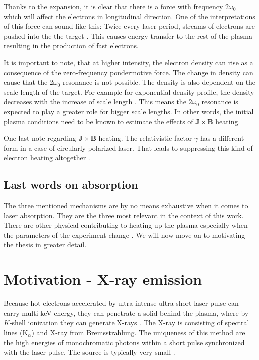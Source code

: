 Thanks to the expansion, it is clear that there is a force with frequency $2\omega_0$ which will affect the electrons in longitudinal direction. One of the interpretations of this force can sound like this: 
Twice every laser period, streams of electrons are pushed into the the target \cite{cai2006}. This causes energy transfer to the rest of the plasma resulting in the production of fast electrons.

It is important to note, that at higher intensity, the electron density can rise as a consequence of the zero-frequency pondermotive force. The change in density can cause that the $2\omega_0$ resonance is not possible. The density is also dependent on the scale length of the target. For example for exponential density profile, the density decreases with the increase of scale length \cite{cai2006}. This means the $2\omega_0$ resonance is expected to play a greater role for bigger scale lengths. In other words, the initial plasma conditions need to be known to estimate the effects of $\bm{J}\times \bm{B}$ heating.

One last note regarding $\bm{J}\times \bm{B}$ heating. The relativistic factor $\gamma$ has a different form in a case of circularly polarized laser. That leads to suppressing this kind of electron heating altogether \cite{cai2006}.

\subsection*{Last words on absorption}
The three mentioned mechanisms are by no means exhaustive when it comes to laser absorption. They are the three most relevant in the context of this work. There are other physical contributing to heating up the plasma especially when the parameters of the experiment change \cite{absorption1}. We will now move on to motivating the thesis in greater detail.

\section{Motivation - X-ray emission}
Because hot electrons accelerated by ultra-intense ultra-short laser pulse can carry multi-keV energy, they can penetrate a solid behind the plasma, where by $K$-shell ionization they can generate X-rays \cite{reich2000}. The X-ray is consisting of spectral lines ($\mathrm{K}_\alpha$) and X-ray from Bremsstrahlung. The uniqueness of this method are the high energies of monochromatic photons within a short pulse synchronized with the laser pulse. The source is typically very small \cite{pfeifer2006}.

